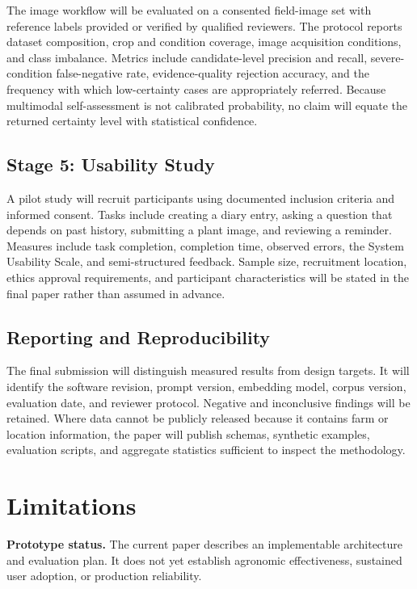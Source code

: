 \documentclass[conference]{IEEEtran}
\begin{document}
The image workflow will be evaluated on a consented field-image set with reference labels provided or verified by qualified reviewers. The protocol reports dataset composition, crop and condition coverage, image acquisition conditions, and class imbalance. Metrics include candidate-level precision and recall, severe-condition false-negative rate, evidence-quality rejection accuracy, and the frequency with which low-certainty cases are appropriately referred. Because multimodal self-assessment is not calibrated probability, no claim will equate the returned certainty level with statistical confidence.

\subsection{Stage 5: Usability Study}

A pilot study will recruit participants using documented inclusion criteria and informed consent. Tasks include creating a diary entry, asking a question that depends on past history, submitting a plant image, and reviewing a reminder. Measures include task completion, completion time, observed errors, the System Usability Scale, and semi-structured feedback. Sample size, recruitment location, ethics approval requirements, and participant characteristics will be stated in the final paper rather than assumed in advance.

\subsection{Reporting and Reproducibility}

The final submission will distinguish measured results from design targets. It will identify the software revision, prompt version, embedding model, corpus version, evaluation date, and reviewer protocol. Negative and inconclusive findings will be retained. Where data cannot be publicly released because it contains farm or location information, the paper will publish schemas, synthetic examples, evaluation scripts, and aggregate statistics sufficient to inspect the methodology.

\section{Limitations}

\textbf{Prototype status.} The current paper describes an implementable architecture and evaluation plan. It does not yet establish agronomic effectiveness, sustained user adoption, or production reliability.
\end{document}
